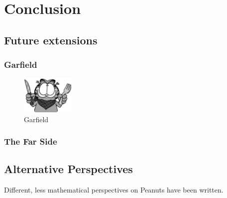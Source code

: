 \chapter{Conclusion}


\section{Future extensions}

\subsection{Garfield}

\begin{figure}
\centering
\includegraphics[width=1in]{garfield.pdf}
\caption{Garfield}
\end{figure}


\subsection{The Far Side}


\section{Alternative Perspectives}

Different, less mathematical perspectives on Peanuts have been
written. \cite{peanutsgospel}

